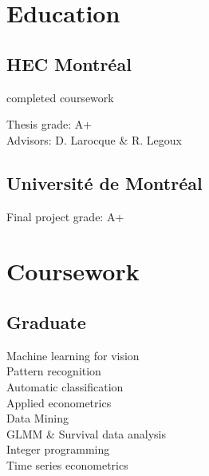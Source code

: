 \documentclass[]{deedy-resume-openfont}
\begin{document}
%
%
\lastupdated

%
%



%
%

\begin{minipage}[t]{0.33\textwidth} 


\section{Education} 

\subsection{HEC Montréal}
 completed coursework
\sectionsep


Thesis grade: A+ \\
Advisors: D. Larocque \& R. Legoux \\


\sectionsep

\subsection{Université de Montréal}
Final project grade: A+ \\
\sectionsep


\section{Coursework}
\subsection{Graduate}
Machine learning for vision \\
Pattern recognition \\
Automatic classification \\
Applied econometrics \\
Data Mining \\
GLMM \& Survival data analysis \\
Integer programming \\
Time series econometrics \\
\sectionsep


\end{minipage}
\end{document}
